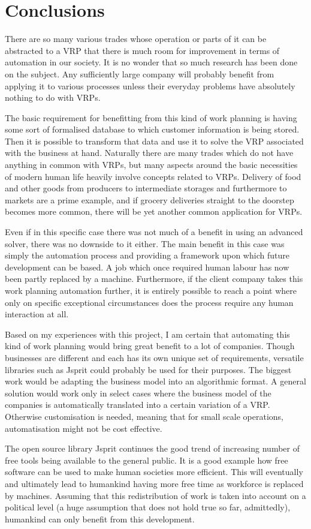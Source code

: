 \chapter{Conclusions}
\label{chapter:discussion}

There are so many various trades whose operation or parts of it can be abstracted to a VRP that there is much room for improvement in terms of automation in our society. It is no wonder that so much research has been done on the subject. Any sufficiently large company will probably benefit from applying it to various processes unless their everyday problems have absolutely nothing to do with VRPs.

The basic requirement for benefitting from this kind of work planning is having some sort of formalised database to which customer information is being stored. Then it is possible to transform that data and use it to solve the VRP associated with the business at hand. Naturally there are many trades which do not have anything in common with VRPs, but many aspects around the basic necessities of modern human life heavily involve concepts related to VRPs. Delivery of food and other goods from producers to intermediate storages and furthermore to markets are a prime example, and if grocery deliveries straight to the doorstep becomes more common, there will be yet another common application for VRPs.  

Even if in this specific case there was not much of a benefit in using an advanced solver, there was no downside to it either. The main benefit in this case was simply the automation process and providing a framework upon which future development can be based. A job which once required human labour has now been partly replaced by a machine. Furthermore, if the client company takes this work planning automation further, it is entirely possible to reach a point where only on specific exceptional circumstances does the process require any human interaction at all. 

Based on my experiences with this project, I am certain that automating this kind of work planning would bring great benefit to a lot of companies. Though businesses are different and each has its own unique set of requirements, versatile libraries such as Jsprit could probably be used for their purposes. The biggest work would be adapting the business model into an algorithmic format. A general solution would work only in select cases where the business model of the companies is automatically translated into a certain variation of a VRP. Otherwise customisation is needed, meaning that for small scale operations, automatisation might not be cost effective. 

The open source library Jsprit continues the good trend of increasing number of free tools being available to the general public. It is a good example how free software can be used to make human societies more efficient. This will eventually and ultimately lead to humankind having more free time as workforce is replaced by machines. Assuming that this redistribution of work is taken into account on a political level (a huge assumption that does not hold true so far, admittedly), humankind can only benefit from this development.


